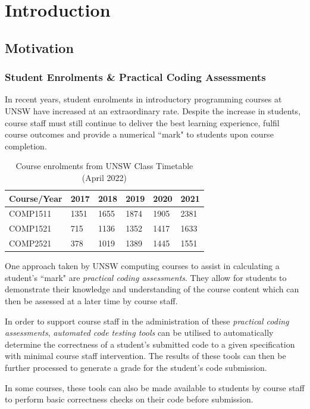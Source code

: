 \documentclass[hidelinks, 12pt]{extreport}
\newcommand{\unchapter}[2]{
    \setcounter{chapter}{#1}
    \setcounter{section}{0}
    \chapter*{#2}
    \addcontentsline{toc}{chapter}{#2}
}
\begin{document}
\tableofcontents

\listoffigures

\listoftables

\unchapter{1}{Introduction}

\section{Motivation}
\subsection{Student Enrolments \& Practical Coding Assessments}
In recent years, student enrolments in introductory programming courses at UNSW have increased at an extraordinary rate. Despite the increase in students, course staff must still continue to deliver the best learning experience, fulfil course outcomes and provide a numerical ``mark" to students upon course completion.

\begin{table}[h]
	\centering
	\begin{tabular}{llllll}
		\toprule
		Course/Year & 2017 & 2018 & 2019 & 2020 & 2021 \\
		\midrule
		COMP1511       & 1351 & 1655 & 1874 & 1905 & 2381 \\
		COMP1521       & 715 & 1136 & 1352 & 1417 & 1633 \\
		COMP2521       & 378 & 1019 & 1389 & 1445 & 1551 \\
		\bottomrule
	\end{tabular}
	\caption{Course enrolments from UNSW Class Timetable (April 2022)}
	\label{tab:table1}
\end{table}

One approach taken by UNSW computing courses to assist in calculating a student's ``mark" are \textit{practical coding assessments}. They allow for students to demonstrate their knowledge and understanding of the course content which can then be assessed at a later time by course staff.

In order to support course staff in the administration of these \textit{practical coding assessments}, \textit{automated code testing tools} can be utilised to automatically determine the correctness of a student's submitted code to a given specification with minimal course staff intervention. The results of these tools can then be further processed to generate a grade for the student's code submission.

In some courses, these tools can also be made available to students by course staff to perform basic correctness checks on their code before submission. 
\end{document}
